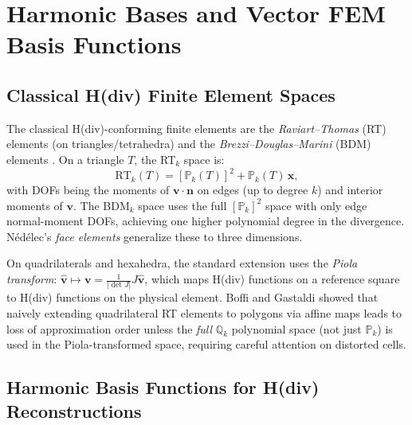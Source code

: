 \section{Harmonic Bases and Vector FEM Basis Functions}

\subsection{Classical H(div) Finite Element Spaces}

The classical H(div)-conforming finite elements are the
\emph{Raviart--Thomas} (RT) elements \cite{RaviartThomas1977} (on
triangles/tetrahedra) and the \emph{Brezzi--Douglas--Marini} (BDM)
elements \cite{bdm1985}. On a triangle $T$, the RT$_k$ space is:
\[
  \mathrm{RT}_k(T) = [\mathbb{P}_k(T)]^2 + \mathbb{P}_k(T)\,\mathbf{x},
\]
with DOFs being the moments of $\mathbf{v}\cdot\mathbf{n}$ on edges (up to
degree $k$) and interior moments of $\mathbf{v}$. The BDM$_k$ space uses the
full $[\mathbb{P}_k]^2$ space with only edge normal-moment DOFs, achieving
one higher polynomial degree in the divergence. N\'{e}d\'{e}lec's
\emph{face elements} \cite{nedelec1986} generalize these to three dimensions.

On quadrilaterals and hexahedra, the standard extension uses the
\emph{Piola transform}: $\hat{\mathbf{v}} \mapsto
\mathbf{v} = \frac{1}{|\det J|} J\hat{\mathbf{v}}$, which maps H(div)
functions on a reference square to H(div) functions on the physical element.
Boffi and Gastaldi \cite{boffi2002remarks} showed that naively extending
quadrilateral RT elements to polygons via affine maps leads to loss of
approximation order unless the \emph{full} $\mathbb{Q}_k$ polynomial space
(not just $\mathbb{P}_k$) is used in the Piola-transformed space, requiring
careful attention on distorted cells.

\subsection{Harmonic Basis Functions for H(div) Reconstructions}

